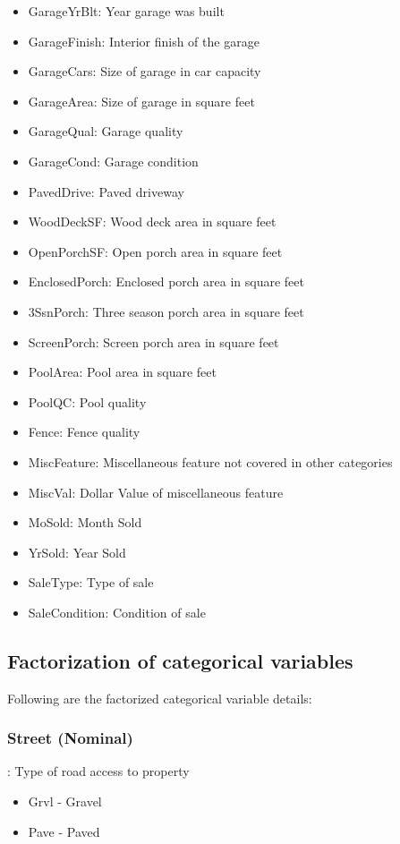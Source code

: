 \documentclass[sigconf]{acmart}
\begin{document}
\begin{itemize}
		\item GarageYrBlt: Year garage was built
		\item GarageFinish: Interior finish of the garage
		\item GarageCars: Size of garage in car capacity
		\item GarageArea: Size of garage in square feet
		\item GarageQual: Garage quality
		\item GarageCond: Garage condition
		\item PavedDrive: Paved driveway
		\item WoodDeckSF: Wood deck area in square feet
		\item OpenPorchSF: Open porch area in square feet
		\item EnclosedPorch: Enclosed porch area in square feet
		\item 3SsnPorch: Three season porch area in square feet
		\item ScreenPorch: Screen porch area in square feet
		\item PoolArea: Pool area in square feet
		\item PoolQC: Pool quality
		\item Fence: Fence quality
		\item MiscFeature: Miscellaneous feature not covered in other categories
		\item MiscVal: Dollar Value of miscellaneous feature
		\item MoSold: Month Sold
		\item YrSold: Year Sold
		\item SaleType: Type of sale
		\item SaleCondition: Condition of sale
	\end{itemize}
	
	\subsection{Factorization of categorical variables}
	Following are the factorized categorical variable details:
	
	\subsubsection{Street (Nominal)}: Type of road access to property
	\begin{itemize}
		\item  Grvl - Gravel
		\item  Pave - Paved
	\end{itemize}
	
\end{document}
